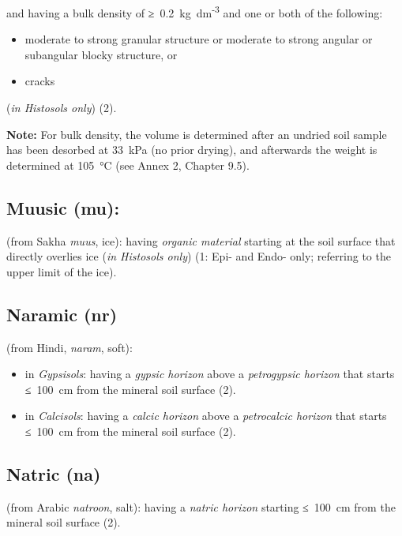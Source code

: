 \documentclass[
  letterpaper,
  DIV=11,
  numbers=noendperiod]{scrreprt}
\providecommand{\tightlist}{%
  \setlength{\itemsep}{0pt}\setlength{\parskip}{0pt}}\usepackage{longtable,booktabs,array}
\begin{document}
and having a bulk density of ≥~0.2~kg~dm\textsuperscript{-3} and one or
both of the following:

\begin{itemize}
\tightlist
\item
  moderate to strong granular structure or moderate to strong angular or
  subangular blocky structure, or
\item
  cracks
\end{itemize}

(\emph{in Histosols only}) (2).

\textbf{Note:} For bulk density, the volume is determined after an
undried soil sample has been desorbed at 33~kPa (no prior drying), and
afterwards the weight is determined at 105~°C (see Annex 2, Chapter
9.5).

\hypertarget{muusic-mu}{%
\subsection{Muusic (mu):}\label{muusic-mu}}

(from Sakha \emph{muus}, ice): having \emph{organic material} starting
at the soil surface that directly overlies ice (\emph{in Histosols
only}) (1: Epi- and Endo- only; referring to the upper limit of the
ice).

\hypertarget{naramic-nr}{%
\subsection{Naramic (nr)}\label{naramic-nr}}

(from Hindi, \emph{naram}, soft):

\begin{itemize}
\tightlist
\item
  in \emph{Gypsisols}: having a \emph{gypsic horizon} above a
  \emph{petrogypsic horizon} that starts ≤~100~cm from the mineral soil
  surface (2).
\item
  in \emph{Calcisols}: having a \emph{calcic horizon} above a
  \emph{petrocalcic horizon} that starts ≤~100~cm from the mineral soil
  surface (2).
\end{itemize}

\hypertarget{natric-na}{%
\subsection{Natric (na)}\label{natric-na}}

(from Arabic \emph{natroon}, salt): having a \emph{natric horizon}
starting ≤~100~cm from the mineral soil surface (2).
\end{document}
